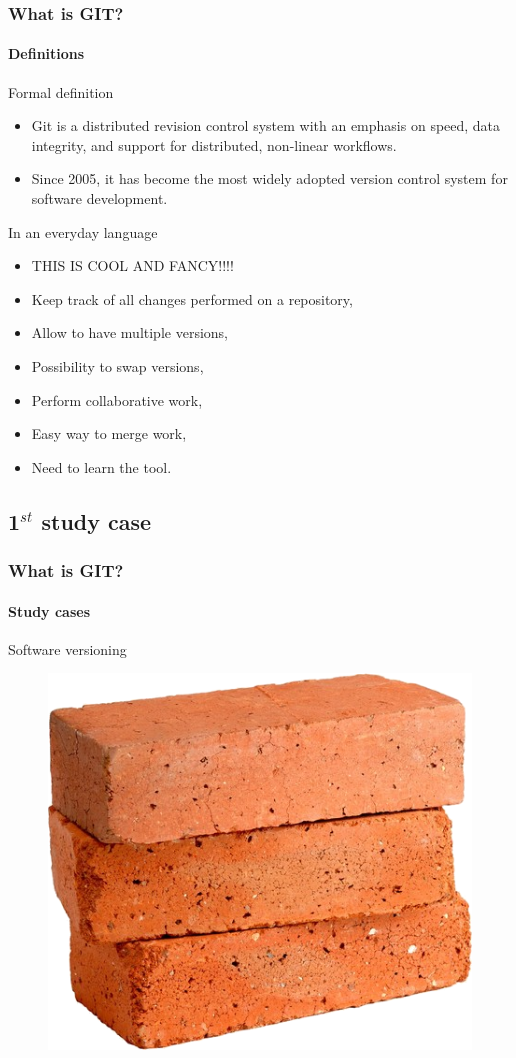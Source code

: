 \documentclass{beamer}
\newcommand{\tick}{\color{green!60!black!80}\ding{51}}
\newcommand{\cross}{\color{red!60!black!80}\ding{55}}
\begin{document}
\begin{frame}
  \frametitle{What is GIT?}
  \framesubtitle{Definitions}
  \begin{block}{\small Formal definition}\footnotesize
    \begin{itemize}
    \item Git is a distributed revision control system with an emphasis on speed, data integrity, and support for distributed, non-linear workflows. 
    \item Since 2005, it has become the most widely adopted version control system for software development.
    \end{itemize}
  \end{block}
  \pause
  \begin{block}{\small In an everyday language}\footnotesize
    \begin{itemize}
    \item THIS IS COOL AND FANCY!!!!
      \pause
    \item[\tick] Keep track of all changes performed on a repository,
      \pause
    \item[\tick] Allow to have multiple versions,
      \pause
    \item[\tick] Possibility to swap versions,
      \pause
    \item[\tick] Perform collaborative work,
      \pause
    \item[\tick] Easy way to merge work,
      \pause
    \item[\cross] Need to learn the tool.
    \end{itemize}
  \end{block}
\end{frame}

\subsection{1$^{st}$ study case}

\begin{frame}
  \frametitle{What is GIT?}
  \framesubtitle{Study cases}
  \begin{block}{Software versioning}
    \begin{figure}
      \centering
      \includegraphics[width=.5\textwidth]{./images/brick.png}
    \end{figure}
  \end{block}
\end{frame}
\end{document}
